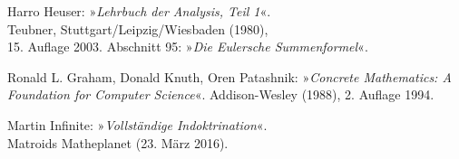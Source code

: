 \documentclass[a4paper,11pt,fleqn,twocolumn,twoside]{scrartcl}
\begin{document}
\vspace{1em}\noindent
[2] Harro Heuser: »\emph{Lehrbuch der Analysis, Teil 1}«.\\
Teubner, Stuttgart/Leipzig/Wiesbaden (1980),\\
15. Auflage 2003. Abschnitt 95: »\emph{Die Eulersche Summenformel}«.

\vspace{1em}\noindent
[3] Ronald L. Graham, Donald Knuth, Oren Patashnik:
»\emph{Concrete Mathematics: A Foundation for Computer Science}«.
Addison-Wesley (1988), 2. Auflage 1994. 

\vspace{1em}\noindent
[4] Martin Infinite: »\emph{Vollständige Indoktrination}«.\\
Matroids Matheplanet (23. März 2016).
\end{document}
